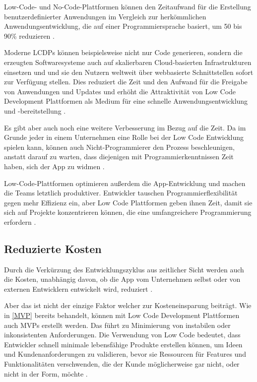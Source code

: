 \documentclass[12pt]{article} %
\begin{document}
	Low-Code- und No-Code-Plattformen können den Zeitaufwand für die Erstellung benutzerdefinierter Anwendungen im Vergleich zur herkömmlichen Anwendungsentwicklung, die auf einer Programmiersprache basiert, um 50 bis 90\% reduzieren \autocite{KevinShuler.2023}. \newline
		
	Moderne LCDPs können beispielsweise nicht nur Code generieren, sondern die erzeugten Softwaresysteme auch auf skalierbaren Cloud-basierten Infrastrukturen einsetzen und und sie den Nutzern weltweit über webbasierte Schnittstellen sofort zur Verfügung stellen. Dies reduziert die Zeit und den Aufwand für die Freigabe von Anwendungen und Updates und erhöht die Attraktivität von Low Code Development Plattformen als Medium für eine schnelle Anwendungsentwicklung und -bereitstellung \autocite{DiRuscio.2022}.
	
	Es gibt aber auch noch eine weitere Verbesserung im Bezug auf die Zeit. Da im Grunde jeder in einem Unternehmen eine Rolle bei der Low Code Entwicklung spielen kann, können auch Nicht-Programmierer den Prozess beschleunigen, anstatt darauf zu warten, dass diejenigen mit Programmierkenntnissen Zeit haben, sich der App zu widmen \autocite{Microsoft.2023}.
	
	Low-Code-Plattformen optimieren außerdem die App-Entwicklung und machen die Teams letztlich produktiver. Entwickler tauschen Programmierflexibilität gegen mehr Effizienz ein, aber Low Code Plattformen geben ihnen Zeit, damit sie sich auf Projekte konzentrieren können, die eine umfangreichere Programmierung erfordern \autocite{Microsoft.2023}.
	
	\subsection{Reduzierte Kosten}	
	Durch die Verkürzung des Entwicklungszyklus aus zeitlicher Sicht werden auch die Kosten, unabhängig davon, ob die App vom Unternehmen selbst oder von externen Entwicklern entwickelt wird, reduziert \autocite{Sanchis.2020b}. \newline
	
	Aber das ist nicht der einzige Faktor welcher zur Kosteneinsparung beiträgt. Wie in \ref{MVP} bereits behandelt, können mit Low Code Development Plattformen auch MVPs erstellt werden. Das führt zu Minimierung von instabilen oder inkonsistenten Anforderungen. Die Verwendung von Low Code bedeutet, dass Entwickler schnell minimale lebensfähige Produkte erstellen können, um Ideen und Kundenanforderungen zu validieren, bevor sie Ressourcen für Features und Funktionalitäten verschwenden, die der Kunde möglicherweise gar nicht, oder nicht in der Form, möchte \autocite{Sanchis.2020b}. \newline
	
\end{document}
